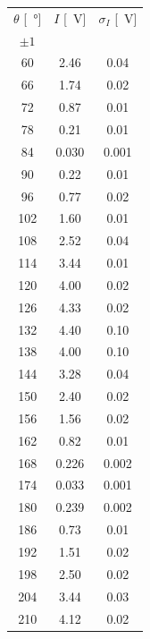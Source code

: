 \documentclass[10pt,oneside,a4paper]{article}
\begin{document}
\begin{minipage}[t]{0.3\linewidth}
\begin{center}
\label{tab:taratura_lambda2}
\begin{tabular}{c|c|c}
\toprule
     $\theta$ [\SI{}{\degree}] &    $I$ [\SI{}{V}] &   $\sigma_I$ [\SI{}{V}]\\
     $\pm 1$ & & \\
\midrule
  60 &  2.46 &  0.04 \\
  66 &  1.74 &  0.02 \\
  72 &  0.87 &  0.01 \\
  78 &  0.21 &  0.01 \\
  84 &  0.030 &  0.001 \\
  90 &  0.22 &  0.01 \\
  96 &  0.77 &  0.02 \\
 102 &  1.60 &  0.01 \\
 108 &  2.52 &  0.04 \\
 114 &  3.44 &  0.01 \\
 120 &  4.00 &  0.02 \\
 126 &  4.33 &  0.02 \\
 132 &  4.40 &  0.10 \\
 138 &  4.00 &  0.10 \\
 144 &  3.28 &  0.04 \\
 150 &  2.40 &  0.02 \\
 156 &  1.56 &  0.02 \\
 162 &  0.82 &  0.01 \\
 168 &  0.226 &  0.002 \\
 174 &  0.033 &  0.001 \\
 180 &  0.239 &  0.002 \\
 186 &  0.73 &  0.01 \\
 192 &  1.51 &  0.02 \\
 198 &  2.50 &  0.02 \\
 204 &  3.44 &  0.03 \\
 210 &  4.12 &  0.02 \\
\bottomrule
\end{tabular}
\end{center}
\end{minipage}
\hspace{1em}
\end{document}
